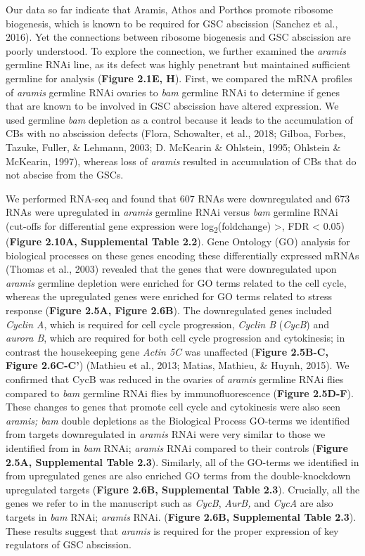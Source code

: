 \documentclass[12pt,oneside]{reedthesis}
\begin{document}
Our data so far indicate that Aramis, Athos and Porthos promote ribosome biogenesis, which is known to be required for GSC abscission (Sanchez et al., 2016). Yet the connections between ribosome biogenesis and GSC abscission are poorly understood. To explore the connection, we further examined the \emph{aramis} germline RNAi line, as its defect was highly penetrant but maintained sufficient germline for analysis (\textbf{Figure 2.1E, H}). First, we compared the mRNA profiles of \emph{aramis} germline RNAi ovaries to \emph{bam} germline RNAi to determine if genes that are known to be involved in GSC abscission have altered expression. We used germline \emph{bam} depletion as a control because it leads to the accumulation of CBs with no abscission defects (Flora, Schowalter, et al., 2018; Gilboa, Forbes, Tazuke, Fuller, \& Lehmann, 2003; D. McKearin \& Ohlstein, 1995; Ohlstein \& McKearin, 1997), whereas loss of \emph{aramis} resulted in accumulation of CBs that do not abscise from the GSCs.

We performed RNA-seq and found that 607 RNAs were downregulated and 673 RNAs were upregulated in \emph{aramis} germline RNAi versus \emph{bam} germline RNAi (cut-offs for differential gene expression were log\textsubscript{2}(foldchange) \textgreater{}\textbar, FDR \textless{} 0.05) (\textbf{Figure 2.10A, Supplemental Table 2.2}). Gene Ontology (GO) analysis for biological processes on these genes encoding these differentially expressed mRNAs (Thomas et al., 2003) revealed that the genes that were downregulated upon \emph{aramis} germline depletion were enriched for GO terms related to the cell cycle, whereas the upregulated genes were enriched for GO terms related to stress response (\textbf{Figure 2.5A, Figure 2.6B}). The downregulated genes included \emph{Cyclin A}, which is required for cell cycle progression, \emph{Cyclin B} (\emph{CycB}) and \emph{aurora B}, which are required for both cell cycle progression and cytokinesis; in contrast the housekeeping gene \emph{Actin 5C} was unaffected (\textbf{Figure 2.5B-C, Figure 2.6C-C'}) (Mathieu et al., 2013; Matias, Mathieu, \& Huynh, 2015). We confirmed that CycB was reduced in the ovaries of \emph{aramis} germline RNAi flies compared to \emph{bam} germline RNAi flies by immunofluorescence (\textbf{Figure 2.5D-F}). These changes to genes that promote cell cycle and cytokinesis were also seen \emph{aramis; bam} double depletions as the Biological Process GO-terms we identified from targets downregulated in \emph{aramis} RNAi were very similar to those we identified from in \emph{bam} RNAi; \emph{aramis} RNAi compared to their controls (\textbf{Figure 2.5A, Supplemental Table 2.3}). Similarly, all of the GO-terms we identified in from upregulated genes are also enriched GO terms from the double-knockdown upregulated targets (\textbf{Figure 2.6B, Supplemental Table 2.3}). Crucially, all the genes we refer to in the manuscript such as \emph{CycB}, \emph{AurB,} and \emph{CycA} are also targets in \emph{bam} RNAi; \emph{aramis} RNAi. (\textbf{Figure 2.6B, Supplemental Table 2.3}). These results suggest that \emph{aramis} is required for the proper expression of key regulators of GSC abscission.
\end{document}
